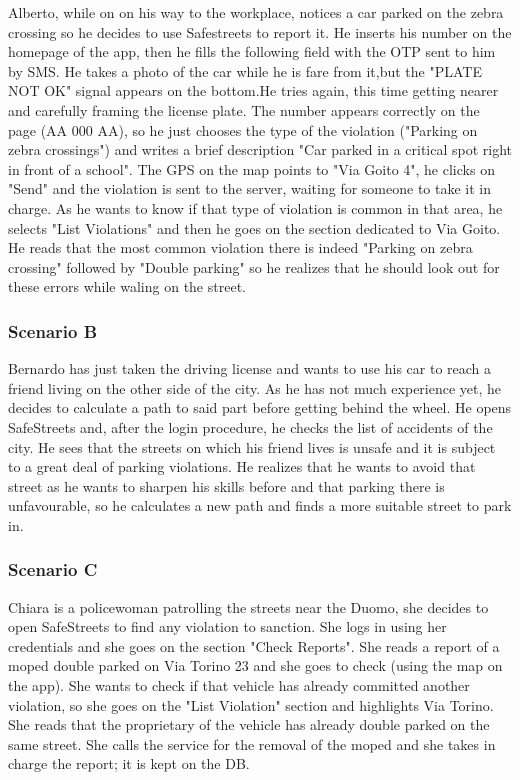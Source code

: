 Alberto, while on on his way to the workplace, notices a car parked on the zebra crossing so he decides to use Safestreets to report it. He inserts his number on the homepage of the app, then he fills the following field with the OTP sent to him by SMS. He takes a photo of the car while he is fare from it,but the "PLATE NOT OK" signal appears on the bottom.He tries again, this time getting nearer and carefully framing the license plate. The number appears correctly on the page (AA 000 AA), so he just chooses the type of the violation ("Parking on zebra crossings") and writes a brief description "Car parked in a critical spot right in front of a school". The GPS on the map points to "Via Goito 4", he clicks on "Send" and the violation is sent to the server, waiting for someone to take it in charge.
As he wants to know if that type of violation is common in that area, he selects "List Violations" and then he goes on the section dedicated to Via Goito. He reads that the most common violation there is indeed "Parking on zebra crossing" followed by "Double parking" so he realizes that he should look out for these errors while waling on the street.

\subsubsection*{Scenario B}

Bernardo has just taken the driving license and wants to use his car to reach a friend living on the other side of the city. As he has not much experience yet, he decides to calculate a path to said part before getting behind the wheel. He opens SafeStreets and, after the login procedure, he checks the list of accidents of the city. He sees that the streets on which his friend lives is unsafe and it is subject to a great deal of parking violations. He realizes that he wants to avoid that street as he wants to sharpen his skills before and that parking there is unfavourable, so he calculates a new path and finds a more suitable street to park in.

\subsubsection*{Scenario C}

Chiara is a policewoman patrolling the streets near the Duomo, she decides to open SafeStreets to find any violation to sanction. She logs in using her credentials and she goes on the section "Check Reports". She reads a report of a moped double parked on Via Torino 23 and she goes to check (using the map on the app). She wants to check if that vehicle has already committed another violation, so she goes on the "List Violation" section and highlights Via Torino. She reads that the proprietary of the vehicle has already double parked on the same street. She calls the service for the removal of the moped and she takes in charge the report; it is kept on the DB.


